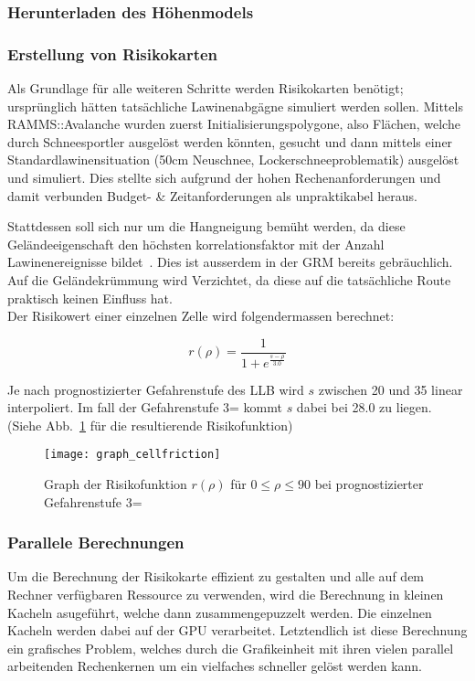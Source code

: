 \subsubsection{Herunterladen des Höhenmodels}


\subsubsection{Erstellung von Risikokarten}

Als Grundlage für alle weiteren Schritte werden Risikokarten benötigt; ursprünglich hätten tatsächliche Lawinenabgägne simuliert werden sollen. Mittels RAMMS::Avalanche wurden zuerst Initialisierungspolygone, also Flächen, welche durch Schneesportler ausgelöst werden könnten, gesucht und dann mittels einer Standardlawinensituation (50cm Neuschnee, Lockerschneeproblematik) ausgelöst und simuliert. Dies stellte sich aufgrund der hohen Rechenanforderungen und damit verbunden Budget- \& Zeitanforderungen als unpraktikabel heraus.

Stattdessen soll sich nur um die Hangneigung bemüht werden, da diese Geländeeigenschaft den höchsten korrelationsfaktor mit der Anzahl Lawinenereignisse bildet~\cite{arpddatasetdocs}. Dies ist ausserdem in der GRM bereits gebräuchlich. Auf die Geländekrümmung wird Verzichtet, da diese auf die tatsächliche Route praktisch keinen Einfluss hat.\\
Der Risikowert einer einzelnen Zelle wird folgendermassen berechnet:

\[
r(\rho) = \frac{1}{1 + e^{\frac{s-\rho}{3.0}}}
\]

Je nach prognostizierter Gefahrenstufe des LLB wird $s$ zwischen 20 und 35 linear interpoliert. Im fall der Gefahrenstufe 3= kommt $s$ dabei bei 28.0 zu liegen. (Siehe Abb.~\ref{fig:graph} für die resultierende Risikofunktion)

\begin{figure}[H]
  \centering
  \texttt{[image: graph\_cellfriction]}
  \caption{Graph der Risikofunktion $r(\rho)$ für $0 \leq \rho \leq 90$ bei prognostizierter Gefahrenstufe 3=}\label{fig:graph}
\end{figure}

\subsubsection{Parallele Berechnungen}

Um die Berechnung der Risikokarte effizient zu gestalten und alle auf dem Rechner verfügbaren Ressource zu verwenden, wird die Berechnung in kleinen Kacheln asugeführt, welche dann zusammengepuzzelt werden. Die einzelnen Kacheln werden dabei auf der GPU verarbeitet. Letztendlich ist diese Berechnung ein grafisches Problem, welches durch die Grafikeinheit mit ihren vielen parallel arbeitenden Rechenkernen um ein vielfaches schneller gelöst werden kann.

